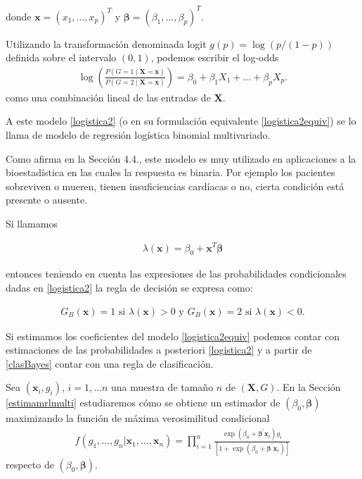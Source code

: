 \documentclass{report}
\begin{document}
donde  $\mathbf{x}=(x_1,\ldots, x_p)^T$ y   $\boldsymbol{\beta}=(\beta_1,\ldots, \beta_p)^T$. 


 Utilizando la transformación denominada logit  $g(p)=\log(p/(1-p))$ definida sobre el intervalo $(0,1)$, podemos escribir el log-odds 
\begin{eqnarray}\label{logistica2equiv}
	 \log\left(\frac{P(G=1 \mid  \mathbf{X}=\mathbf{x})}{P(G=2 \mid  \mathbf{X}=\mathbf{x})}\right)=\beta_0+\beta_1X_1+...+\beta_pX_p.
\end{eqnarray}
como una combinación lineal de las entradas de $\mathbf{X}$. 



A este modelo \eqref{logistica2} (o en su formulación equivalente \eqref{logistica2equiv}) se lo llama de modelo de regresión logística binomial multivariado. 

Como afirma \cite{htf} en la Sección 4.4., este modelo es muy utilizado en aplicaciones a la bioestadística  en las cuales la respuesta es binaria. Por ejemplo los pacientes sobreviven o mueren, tienen insuficiencias cardíacas o no, cierta condición está presente o ausente. 


Si llamamos 

\begin{eqnarray}\label{lamb}
	\lambda(\mathbf{x})=\beta_0+\mathbf{x}^T\boldsymbol{\beta}
\end{eqnarray}

entonces teniendo en cuenta las expresiones de las probabilidades condicionales dadas en    \eqref{logistica2}  la regla de decisión se expresa como:

\begin{eqnarray}\label{clasBayes2log}
	G_B(\mathbf{x})=1 \text { si } \lambda(\mathbf{x})>0   \text { y } 	G_B(\mathbf{x})=2  \text { si }  \lambda(\mathbf{x})<0. 
\end{eqnarray}




Si estimamos los coeficientes del modelo \eqref{logistica2equiv} podemos contar con estimaciones de las probabilidades a posteriori \eqref{logistica2} y a partir de \eqref{clasBayes} contar con una regla de clasificación. 



Sea   $(\mathbf{x}_i, g_i)$, $i=1,\ldots n$ una muestra de tamaño $n$  de $(\mathbf{X}, G)$. En la Sección \ref{estimamrlmulti} estudiaremos cómo se obtiene un estimador de $(\beta_0, \boldsymbol{\beta})$ maximizando la función de máxima verosimilitud condicional 
\begin{eqnarray}\label{verosimil1}
	f(g_1,\ldots, g_n|\mathbf{x}_1,\ldots, \mathbf{x}_n )= \prod_{i=1}^n \frac{\exp  \left(\beta_0+ \boldsymbol{\beta}^{\prime} \mathbf{x}_i\right) g_i }{\left[1+\exp \left(\beta_0+ \boldsymbol{\beta}^{\prime} \mathbf{x}_i\right)\right]}
\end{eqnarray}
respecto de $(\beta_0, \boldsymbol{\beta})$. 
\end{document}

